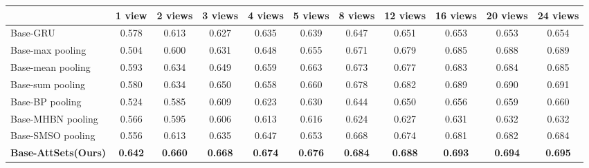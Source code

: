 \documentclass[twocolumn]{svjour3}    \pdfoutput=1
\newcommand{\nickname}{AttSets}
\begin{document}
\begin{table*}[t]
\caption{Group 4: mean IoU for multi-view reconstruction of all 13 categories in ShapeNet testing split. All networks are firstly trained given only 1 image for each object in Stage 1. The \nickname{} module is further trained given \textbf{24 images} per object in Stage 2, while other competing approaches are fine-tuned given \textbf{24 images} per object in Stage 2.}
\centering
\label{tab:iou_r2n2_24v}
\tabcolsep=0.125cm
\begin{tabular}{ l|cccccccccc}
\hline
&1 view&2 views&3 views& 4 views&5 views&8 views&12 views&16 views&20 views&24 views \\
\hline
Base-GRU &0.578 &0.613&0.627&0.635&0.639&0.647&0.651&0.653&0.653&0.654 \\
Base-max pooling &0.504&0.600&0.631&0.648&0.655&0.671&0.679&0.685&0.688&0.689 \\
Base-mean pooling &0.593&0.634&0.649&0.659&0.663&0.673&0.677&0.683&0.684&0.685 \\
Base-sum pooling &0.580&0.634&0.650&0.658&0.660&0.678&0.682&0.689&0.690&0.691 \\
Base-BP pooling &0.524&0.585&0.609&0.623&0.630&0.644&0.650&0.656&0.659&0.660 \\
Base-MHBN pooling &0.566&0.595&0.606&0.613&0.616&0.624&0.627&0.631&0.632&0.632 \\
Base-SMSO pooling &0.556&0.613&0.635&0.647&0.653&0.668&0.674&0.681&0.682&0.684 \\
\textbf{Base-\nickname{}(Ours)} &\textbf{0.642}&\textbf{0.660}&\textbf{0.668}&\textbf{0.674}&\textbf{0.676}&\textbf{0.684}
&\textbf{0.688}&\textbf{0.693}&\textbf{0.694}&\textbf{0.695} \\
\hline
\end{tabular}
\vspace{-0.1 cm}
\end{table*}
\end{document}
